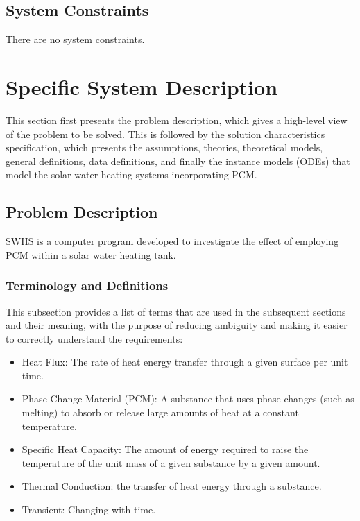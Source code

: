 \documentclass[12pt]{article}
\newcommand{\progname}{SWHS}
\begin{document}
\subsection{System Constraints}

There are no system constraints.

\section{Specific System Description}

This section first presents the problem description, which gives a high-level
view of the problem to be solved. This is followed by the solution
characteristics specification, which presents the assumptions, theories,
theoretical models, general definitions, data definitions, and finally the
instance models (ODEs) that model the solar water heating systems incorporating
PCM.

\subsection{Problem Description} \label{Sec_pd}

\progname{} is a computer program developed to investigate the effect of
employing PCM within a solar water heating tank.


\subsubsection{Terminology and  Definitions}

This subsection provides a list of terms that are used in the subsequent
sections and their meaning, with the purpose of reducing ambiguity and making it
easier to correctly understand the requirements:

\begin{itemize}

\item Heat Flux: The rate of heat energy transfer through a given surface per unit time.

\item Phase Change Material (PCM): A substance that uses phase changes (such as melting)
  to absorb or release large amounts of heat at a constant temperature.

\item Specific Heat Capacity: The amount of energy required to raise the
  temperature of the unit mass of a given substance by a given amount.

\item Thermal Conduction: the transfer of heat energy through a substance.

\item Transient: Changing with time.

\end{itemize}
\end{document}
